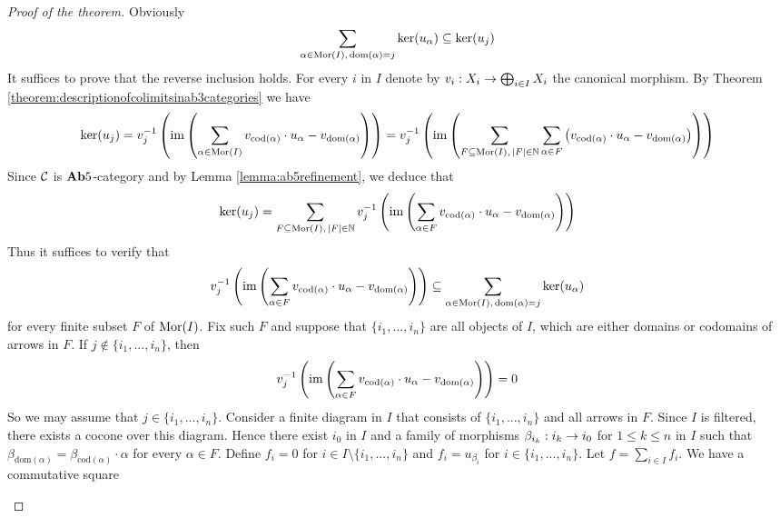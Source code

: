 \begin{proof}[Proof of the theorem]
Obviously
$$\sum_{\alpha \in \mathrm{Mor}(I),\,\mathrm{dom}(\alpha) = j}\ker(u_{\alpha})\subseteq \ker(u_j)$$
It suffices to prove that the reverse inclusion holds. For every $i$ in $I$ denote by $v_i:X_i\rightarrow \bigoplus_{i\in I}X_i$ the canonical morphism. By Theorem \ref{theorem:descriptionofcolimitsinab3categories} we have 
$$\ker(u_j) = v_j^{-1}\left(\mathrm{im}\left(\sum_{\alpha \in \mathrm{Mor}(I)}v_{\mathrm{cod}(\alpha)}\cdot u_{\alpha}-v_{\mathrm{dom}(\alpha)}\right)\right) = v_j^{-1}\left(\mathrm{im}\left(\sum_{F\subseteq \mathrm{Mor}(I),\,|F|\in {\mathbb N}}\sum_{\alpha \in F}\left(v_{\mathrm{cod}(\alpha)}\cdot u_{\alpha}-v_{\mathrm{dom}(\alpha)}\right)\right)\right)$$
Since ${\mathcal C}$ is $\mathbf{Ab}5$-category and by Lemma \ref{lemma:ab5refinement}, we deduce that
$$\ker(u_j) = \sum_{F\subseteq \mathrm{Mor}(I),\,|F|\in {\mathbb N}}v_j^{-1}\left(\mathrm{im}\left(\sum_{\alpha \in F} v_{\mathrm{cod}(\alpha)}\cdot u_{\alpha}-v_{\mathrm{dom}(\alpha)}\right)\right)$$
Thus it suffices to verify that 
$$v_j^{-1}\left(\mathrm{im}\left(\sum_{\alpha \in F} v_{\mathrm{cod}(\alpha)}\cdot u_{\alpha}-v_{\mathrm{dom}(\alpha)}\right)\right) \subseteq \sum_{\alpha \in \mathrm{Mor}(I),\,\mathrm{dom}(\alpha) = j}\ker(u_{\alpha})$$
for every finite subset $F$ of $\mathrm{Mor}(I)$. Fix such $F$ and suppose that $\{i_1,...,i_n\}$ are all objects of $I$, which are either domains or codomains of arrows in $F$. If $j\not \in \{i_1,...,i_n\}$, then 
$$v_j^{-1}\left(\mathrm{im}\left(\sum_{\alpha \in F} v_{\mathrm{cod}(\alpha)}\cdot u_{\alpha}-v_{\mathrm{dom}(\alpha)}\right)\right)=0$$
So we may assume that $j\in \{i_1,...,i_n\}$. Consider a finite diagram in $I$ that consists of $\{i_1,...,i_n\}$ and all arrows in $F$. Since $I$ is filtered, there exists a cocone over this diagram. Hence there exist $i_0$ in $I$ and a family of morphisms $\beta_{i_k}:i_k\rightarrow i_0$ for $1\leq k\leq n$ in $I$ such that $\beta_{\mathrm{dom}(\alpha)} = \beta_{\mathrm{cod}(\alpha)}\cdot \alpha$ for every $\alpha \in F$. Define $f_i = 0$ for $i \in I\setminus \{i_1,...,i_n\}$ and $f_i = u_{\beta_i}$ for $i\in \{i_1,...,i_n\}$. Let $f = \sum_{i\in I}f_i$. We have a commutative square
\begin{center}
\end{center}
\end{proof}

